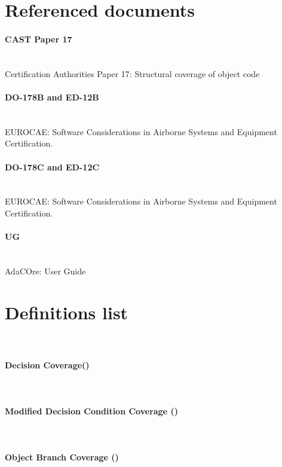 \section{Referenced documents}
\paragraph*{CAST Paper 17} \ \\
Certification Authorities Paper 17: Structural coverage of object code
\paragraph*{DO-178B and ED-12B} \ \\
EUROCAE: Software Considerations in Airborne Systems and Equipment Certification.
\paragraph*{DO-178C and ED-12C} \ \\
EUROCAE: Software Considerations in Airborne Systems and Equipment Certification.
\paragraph*{\xcov UG} \ \\
AdaCOre: \xcov User Guide

\section{Definitions list}

\paragraph*{\xcov} \ \\

\paragraph*{Decision Coverage(\dc)} \ \\

\paragraph*{Modified Decision Condition Coverage (\mcdc)} \ \\

\paragraph*{Object Branch Coverage (\obc)} \ \\

